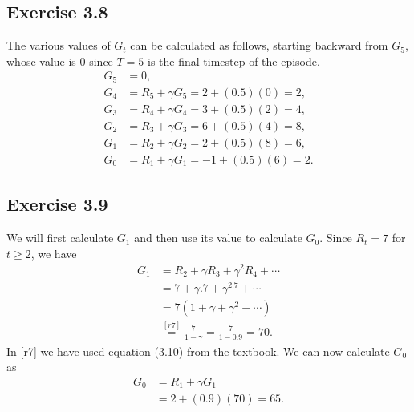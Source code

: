 \documentclass[10pt]{article}
\begin{document}
	\subsection*{Exercise 3.8}
	\label{ss:3.8}
	The various values of $G_t$ can be calculated as follows, starting backward from $G_5$, whose value is $0$ since $T=5$ is the final timestep of the episode.
	\begin{align*}
	G_5 &= 0,\\
	G_4 &= R_5 + \gamma G_5 = 2 + (0.5)(0) = 2,\\
	G_3 &= R_4 + \gamma G_4 = 3 + (0.5)(2) = 4,\\
	G_2 &= R_3 + \gamma G_3 = 6 + (0.5)(4) = 8,\\
	G_1 &= R_2 + \gamma G_2 = 2 + (0.5)(8) = 6,\\
	G_0 &= R_1 + \gamma G_1 = -1 + (0.5)(6) = 2.
	\end{align*}
	\subsection*{Exercise 3.9}
	\label{ss:3.9}
	We will first calculate $G_1$ and then use its value to calculate $G_0$. Since $R_t = 7$ for $t\geq 2$, we have
	\begin{align*}
	G_1 &= R_2 + \gamma R_3 + \gamma^2 R_4 + \cdots\\
	&= 7 + \gamma.7 + \gamma^2.7 + \cdots\\
	&= 7(1 + \gamma + \gamma^2 + \cdots)\\
	&\stackrel{[r7]}{=} \frac{7}{1-\gamma} = \frac{7}{1-0.9} = 70. 
	\end{align*}
	In [r7] we have used equation (3.10) from the textbook. We can now calculate $G_0$ as
	\begin{align*}
	G_0 &= R_1 + \gamma G_1\\
	&= 2 + (0.9)(70) = 65.
	\end{align*}
\end{document}
